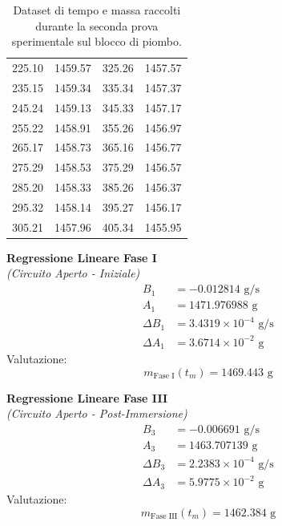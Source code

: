 \documentclass[a4paper,12pt]{article}
\begin{document}
\begin{table}[htbp]
\begin{minipage}[t]{0.54\textwidth}
\begin{tabular}{cc|cc}
            225.10 & 1459.57 & 325.26 & 1457.57 \\
            235.15 & 1459.34 & 335.34 & 1457.37 \\
            245.24 & 1459.13 & 345.33 & 1457.17 \\
            255.22 & 1458.91 & 355.26 & 1456.97 \\
            265.17 & 1458.73 & 365.16 & 1456.77 \\
            275.29 & 1458.53 & 375.29 & 1456.57 \\
            285.20 & 1458.33 & 385.26 & 1456.37 \\
            295.32 & 1458.14 & 395.27 & 1456.17 \\
            305.21 & 1457.96 & 405.34 & 1455.95 \\ \hline
        \end{tabular}
    \end{minipage}
    \caption{Dataset di tempo e massa raccolti durante la seconda prova sperimentale sul blocco di piombo.}
    \label{tab:dati_piombo_2}
\end{table}

\vspace{0.2cm}
\noindent
\begin{minipage}[t]{0.48\textwidth}
    \centering
    \textbf{Regressione Lineare Fase I} \\
    \textit{(Circuito Aperto - Iniziale)}
    \begin{align*}
        B_1 &= -0.012814 \text{ g/s} \\
        A_1 &= 1471.976988 \text{ g} \\
        \Delta B_1 &= 3.4319 \times 10^{-4} \text{ g/s} \\
        \Delta A_1 &= 3.6714 \times 10^{-2} \text{ g}
    \end{align*}
    Valutazione:
    \begin{equation*}
        m_{\text{Fase I}}(t_m) = 1469.443\text{ g}
    \end{equation*}
\end{minipage}
\hfill
\begin{minipage}[t]{0.48\textwidth}
    \centering
    \textbf{Regressione Lineare Fase III} \\
    \textit{(Circuito Aperto - Post-Immersione)}
    \begin{align*}
        B_3 &= -0.006691 \text{ g/s} \\
        A_3 &= 1463.707139 \text{ g} \\
        \Delta B_3 &= 2.2383 \times 10^{-4} \text{ g/s} \\
        \Delta A_3 &= 5.9775 \times 10^{-2} \text{ g}
    \end{align*}
    Valutazione:
    \begin{equation*}
        m_{\text{Fase III}}(t_m) = 1462.384\text{ g}
    \end{equation*}
\end{minipage}
\end{document}

